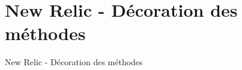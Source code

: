 \chapter{New Relic - Décoration des méthodes}
\label{app:newrelicdecorationmethodes}

\begin{listing}[H]
  \caption{New Relic - Décoration des méthodes}
\end{listing}
